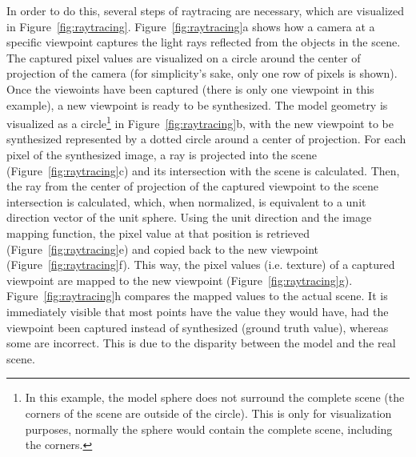 In order to do this, several steps of raytracing are necessary, which are visualized in Figure~\ref{fig:raytracing}. Figure~\ref{fig:raytracing}a shows how a camera at a specific viewpoint captures the light rays reflected from the objects in the scene. The captured pixel values are visualized on a circle around the center of projection of the camera (for simplicity's sake, only one row of pixels is shown). Once the viewoints have been captured (there is only one viewpoint in this example), a new viewpoint is ready to be synthesized. The model geometry is visualized as a circle\footnote{In this example, the model sphere does not surround the complete scene (the corners of the scene are outside of the circle). This is only for visualization purposes, normally the sphere would contain the complete scene, including the corners.} in Figure~\ref{fig:raytracing}b, with the new viewpoint to be synthesized represented by a dotted circle around a center of projection. For each pixel of the synthesized image, a ray is projected into the scene (Figure~\ref{fig:raytracing}c) and its intersection with the scene is calculated. Then, the ray from the center of projection of the captured viewpoint to the scene intersection is calculated, which, when normalized, is equivalent to a unit direction vector of the unit sphere. Using the unit direction and the image mapping function, the pixel value at that position is retrieved (Figure~\ref{fig:raytracing}e) and copied back to the new viewpoint (Figure~\ref{fig:raytracing}f). This way, the pixel values (i.e. texture) of a captured viewpoint are mapped to the new viewpoint (Figure~\ref{fig:raytracing}g). Figure~\ref{fig:raytracing}h compares the mapped values to the actual scene. It is immediately visible that most points have the value they would have, had the viewpoint been captured instead of synthesized (ground truth value), whereas some are incorrect. This is due to the disparity between the model and the real scene.

